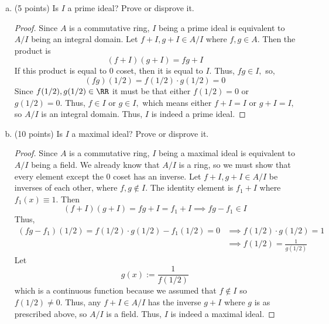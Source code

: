 \documentclass{article}
\begin{document}
\begin{itemize}
\begin{enumerate}[(a)]
			\item (5 points) Is $I$ a prime ideal? Prove or disprove it.
				\begin{proof}
					Since $A$ is a commutative ring, $I$ being a prime ideal is equivalent to $A/I$ being an integral domain. Let $f+I, g+I\in A/I$ where $f, g\in A.$ Then the product is
					\[(f+I)(g+I)=fg+I\]
					If this product is equal to 0 coset, then it is equal to $I.$ Thus, $fg\in I,$ so,
					\[(fg)(1/2) = f(1/2)\cdot g(1/2) = 0\]
					Since $f(1/2), g(1/2)\in \RR$ it must be that either $f(1/2)=0$ or $g(1/2)=0.$ Thus, $f\in I$ or $g\in I,$ which means either $f+I=I$ or $g+I=I,$ so $A/I$ is an integral domain. Thus, $I$ is indeed a prime ideal.
				\end{proof}

			\item (10 points) Is $I$ a maximal ideal? Prove or disprove it.
				\begin{proof}
					Since $A$ is a commutative ring, $I$ being a maximal ideal is equivalent to $A/I$ being a field. We already know that $A/I$ is a ring, so we must show that every element except the 0 coset has an inverse. Let $f+I, g+I\in A/I$ be inverses of each other, where $f, g\notin I.$ The identity element is $f_1+I$ where $f_1(x)\equiv1.$ Then 
					\[(f+I)(g+I)=fg+I=f_1+I\implies fg-f_1\in I\]
					Thus,
					\begin{align*}
						(fg-f_1)(1/2)=f(1/2)\cdot g(1/2)-f_1(1/2) = 0&\implies f(1/2)\cdot g(1/2)=1 \\
						&\implies f(1/2) = \frac{1}{g(1/2)}
					\end{align*}
					Let
					\[g(x):=\frac{1}{f(1/2)}\]
					which is a continuous function because we assumed that $f\notin I$ so $f(1/2)\neq 0.$ Thus, any $f+I\in A/I$ has the inverse $g+I$ where $g$ is as prescribed above, so $A/I$ is a field. Thus, $I$ is indeed a maximal ideal.
				\end{proof}
				
		\end{enumerate}

		\newpage


\end{itemize}
\end{document}
